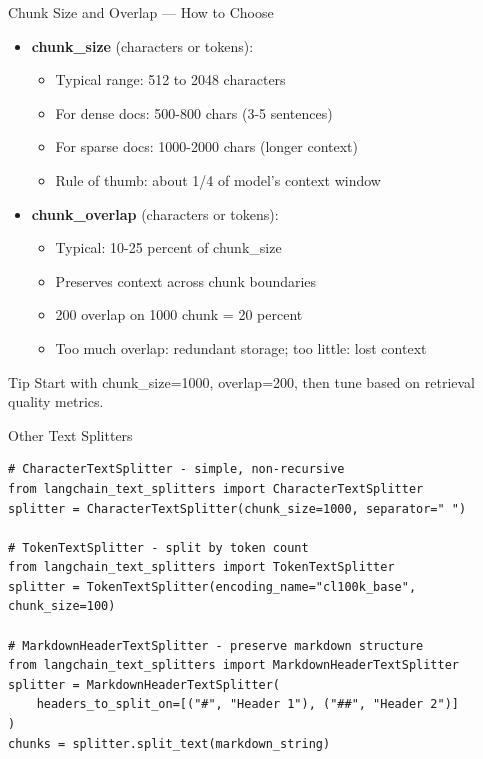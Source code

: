 \documentclass[aspectratio=169,11pt]{beamer}
\begin{document}
\begin{frame}{Chunk Size and Overlap --- How to Choose}
  \vspace{0.15cm}
  \begin{itemize}
    \setlength{\itemsep}{1pt}
    \item \textbf{chunk\_size} (characters or tokens):
    \begin{itemize}
    \setlength{\itemsep}{1pt}
      \item Typical range: 512 to 2048 characters
      \item For dense docs: 500-800 chars (3-5 sentences)
      \item For sparse docs: 1000-2000 chars (longer context)
      \item Rule of thumb: about 1/4 of model's context window
    \end{itemize}

    \item \textbf{chunk\_overlap} (characters or tokens):
    \begin{itemize}
    \setlength{\itemsep}{1pt}
      \item Typical: 10-25 percent of chunk\_size
      \item Preserves context across chunk boundaries
      \item 200 overlap on 1000 chunk = 20 percent
      \item Too much overlap: redundant storage; too little: lost context
    \end{itemize}
  \end{itemize}

  \vspace{1cm}
  \begin{tipbox}{Tip}
    Start with chunk\_size=1000, overlap=200, then tune based on retrieval quality metrics.
  \end{tipbox}
\end{frame}

\begin{frame}[fragile]{Other Text Splitters}
  \begin{lstlisting}
# CharacterTextSplitter - simple, non-recursive
from langchain_text_splitters import CharacterTextSplitter
splitter = CharacterTextSplitter(chunk_size=1000, separator=" ")

# TokenTextSplitter - split by token count
from langchain_text_splitters import TokenTextSplitter
splitter = TokenTextSplitter(encoding_name="cl100k_base", chunk_size=100)

# MarkdownHeaderTextSplitter - preserve markdown structure
from langchain_text_splitters import MarkdownHeaderTextSplitter
splitter = MarkdownHeaderTextSplitter(
    headers_to_split_on=[("#", "Header 1"), ("##", "Header 2")]
)
chunks = splitter.split_text(markdown_string)
  \end{lstlisting}
\end{frame}
\end{document}
